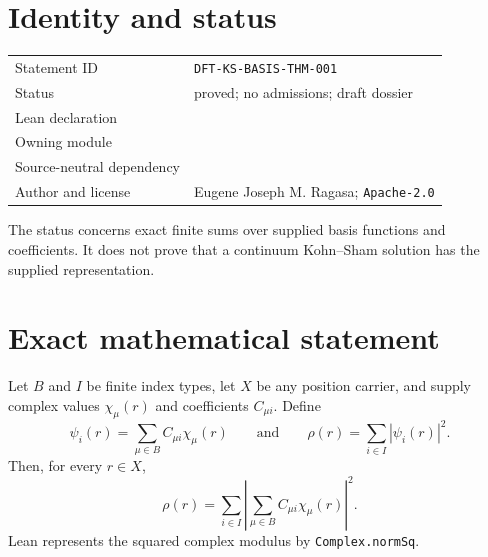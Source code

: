 
\section{Identity and status}
\begin{tabularx}{\textwidth}{@{}lY@{}}
\toprule
Statement ID & \texttt{DFT-KS-BASIS-THM-001} \\
Status & proved; no admissions; draft dossier \\
Lean declaration &  \\
Owning module &  \\
Source-neutral dependency &  \\
Author and license & Eugene Joseph M. Ragasa; \texttt{Apache-2.0} \\
\bottomrule
\end{tabularx}
The status concerns exact finite sums over supplied basis functions and coefficients.  It does not
prove that a continuum Kohn--Sham solution has the supplied representation.

\section{Exact mathematical statement}
Let $B$ and $I$ be finite index types, let $X$ be any position carrier, and supply complex values
$\chi_\mu(r)$ and coefficients $C_{\mu i}$.  Define
\[
 \psi_i(r)=\sum_{\mu\in B} C_{\mu i}\chi_\mu(r)
 \qquad\text{and}\qquad
 \rho(r)=\sum_{i\in I}|\psi_i(r)|^2.
\]
Then, for every $r\in X$,
\[
 \rho(r)=\sum_{i\in I}
   \left|\sum_{\mu\in B}C_{\mu i}\chi_\mu(r)\right|^2.
\]
Lean represents the squared complex modulus by \texttt{Complex.normSq}.

